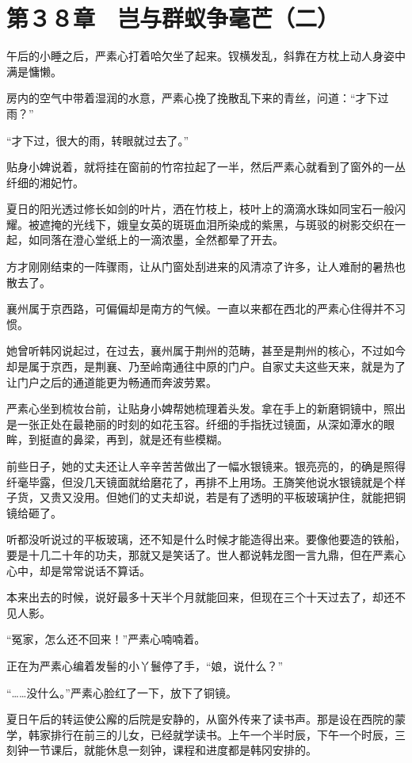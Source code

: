 \section{第３８章　岂与群蚁争毫芒（二）}

午后的小睡之后，严素心打着哈欠坐了起来。钗横发乱，斜靠在方枕上动人身姿中满是慵懒。

房内的空气中带着湿润的水意，严素心挽了挽散乱下来的青丝，问道：“才下过雨？”

“才下过，很大的雨，转眼就过去了。”

贴身小婢说着，就将挂在窗前的竹帘拉起了一半，然后严素心就看到了窗外的一丛纤细的湘妃竹。

夏日的阳光透过修长如剑的叶片，洒在竹枝上，枝叶上的滴滴水珠如同宝石一般闪耀。被遮掩的光线下，娥皇女英的斑斑血泪所染成的紫黑，与斑驳的树影交织在一起，如同落在澄心堂纸上的一滴浓墨，全然都晕了开去。

方才刚刚结束的一阵骤雨，让从门窗处刮进来的风清凉了许多，让人难耐的暑热也散去了。

襄州属于京西路，可偏偏却是南方的气候。一直以来都在西北的严素心住得并不习惯。

她曾听韩冈说起过，在过去，襄州属于荆州的范畴，甚至是荆州的核心，不过如今却是属于京西，是荆襄、乃至岭南通往中原的门户。自家丈夫这些天来，就是为了让门户之后的通道能更为畅通而奔波劳累。

严素心坐到梳妆台前，让贴身小婢帮她梳理着头发。拿在手上的新磨铜镜中，照出是一张正处在最艳丽的时刻的如花玉容。纤细的手指抚过镜面，从深如潭水的眼眸，到挺直的鼻梁，再到，就是还有些模糊。

前些日子，她的丈夫还让人辛辛苦苦做出了一幅水银镜来。银亮亮的，的确是照得纤毫毕露，但没几天镜面就给磨花了，再排不上用场。王旖笑他说水银镜就是个样子货，又贵又没用。但她们的丈夫却说，若是有了透明的平板玻璃护住，就能把铜镜给砸了。

听都没听说过的平板玻璃，还不知是什么时候才能造得出来。要像他要造的铁船，要是十几二十年的功夫，那就又是笑话了。世人都说韩龙图一言九鼎，但在严素心心中，却是常常说话不算话。

本来出去的时候，说好最多十天半个月就能回来，但现在三个十天过去了，却还不见人影。

“冤家，怎么还不回来！”严素心喃喃着。

正在为严素心编着发髻的小丫鬟停了手，“娘，说什么？”

“……没什么。”严素心脸红了一下，放下了铜镜。

夏日午后的转运使公廨的后院是安静的，从窗外传来了读书声。那是设在西院的蒙学，韩家排行在前三的儿女，已经就学读书。上午一个半时辰，下午一个时辰，三刻钟一节课后，就能休息一刻钟，课程和进度都是韩冈安排的。

